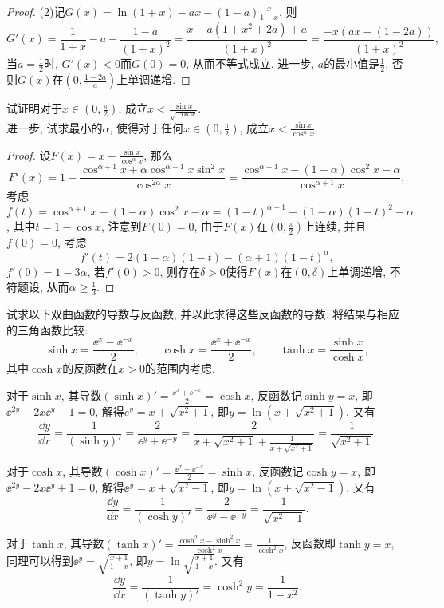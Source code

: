 \begin{quiza}
\begin{proof}
(2)记\(G(x)=\ln(1+x)-ax-(1-a)\frac{x}{1+x}\), 则\[G'(x)=\frac{1}{1+x}-a-\frac{1-a}{(1+x)^2}=\frac{x-a(1+x^2+2a)+a}{(1+x)^2}=\frac{-x(ax-(1-2a))}{(1+x)^2},\]当\(a=\frac{1}{2}\)时, \(G'(x)<0\)而\(G(0)=0\), 从而不等式成立. 进一步, \(a\)的最小值是\(\frac{1}{2}\), 否则\(G(x)\)在\(\left(0,\frac{1-2a}{a}\right)\)上单调递增.
\end{proof}
\woe 试证明对于\(x\in\left(0,\frac{\pi}{2}\right)\), 成立\(x<\frac{\sin x}{\sqrt{\cos x}}\).\\ 进一步, 试求最小的\(\alpha\), 使得对于任何\(x\in\left(0,\frac{\pi}{2}\right)\), 成立\(x<\frac{\sin x}{\cos^\alpha x}\).
\begin{proof}
设\(F(x)=x-\frac{\sin x}{\cos^{\alpha}x}\), 那么\[F'(x)=1-\frac{\cos^{\alpha+1}x+\alpha\cos^{\alpha-1}x\sin^2x}{\cos^{2\alpha}x}=\frac{\cos^{\alpha+1}x-(1-\alpha)\cos^2x-\alpha}{\cos^{\alpha+1}x},\]考虑\(f(t)=\cos^{\alpha+1}x-(1-\alpha)\cos^2x-\alpha=(1-t)^{\alpha+1}-(1-\alpha)(1-t)^2-\alpha\), 其中\(t=1-\cos x\), 注意到\(F(0)=0\), 由于\(F(x)\)在\(\left(0,\frac{\pi}{2}\right)\)上连续, 并且\(f(0)=0\), 考虑\[f'(t)=2(1-\alpha)(1-t)-(\alpha+1)(1-t)^\alpha,\]\(f'(0)=1-3\alpha\), 若\(f'(0)>0\), 则存在\(\delta>0\)使得\(F(x)\)在\((0,\delta)\)上单调递增, 不符题设, 从而\(\alpha\geqslant\frac{1}{3}\).
\end{proof}
\woe 试求以下双曲函数的导数与反函数, 并以此求得这些反函数的导数. 将结果与相应的三角函数比较:\[\sinh x=\frac{\ee^x-\ee^{-x}}{2},\qquad \cosh x=\frac{\ee^x+\ee^{-x}}{2},\qquad \tanh x=\frac{\sinh x}{\cosh x},\]其中\(\cosh x\)的反函数在\(x>0\)的范围内考虑.
\begin{solution}
对于\(\sinh x\), 其导数\(\left(\sinh x\right)'=\frac{\ee^x+\ee^{-x}}{2}=\cosh x\), 反函数记\(\sinh y=x\), 即\(\ee^{2y}-2x\ee^{y}-1=0\), 解得\(e^{y}=x+\sqrt{x^2+1}\), 即\(y=\ln(x+\sqrt{x^2+1})\). 又有\[\frac{\dd y}{\dd x}=\frac{1}{(\sinh y)'}=\frac{2}{\ee^{y}+\ee^{-y}}=\frac{2}{x+\sqrt{x^2+1}+\displaystyle\frac{1}{x+\sqrt{x^2+1}}}=\frac{1}{\sqrt{x^2+1}}.\]

对于\(\cosh x\), 其导数\((\cosh x)'=\frac{\ee^x-\ee^{-x}}{2}=\sinh x\), 反函数记\(\cosh y=x\), 即\(\ee^{2y}-2x\ee^{y}+1=0\), 解得\(\ee^y=x+\sqrt{x^2-1}\), 即\(y=\ln(x+\sqrt{x^2-1})\). 又有\[\frac{\dd y}{\dd x}=\frac{1}{(\cosh y)'}=\frac{2}{\ee^y-\ee^{-y}}=\frac{1}{\sqrt{x^2-1}}.\]

对于\(\tanh x\), 其导数\(\left(\tanh x\right)'=\frac{\cosh^2x-\sinh^2x}{\cosh^2x}=\frac{1}{\cosh^2x}\), 反函数即\(\tanh y=x\), 同理可以得到\(\ee^y=\sqrt{\frac{x+1}{1-x}}\), 即\(y=\ln\sqrt{\frac{x+1}{1-x}}\). 又有\[\frac{\dd y}{\dd x}=\frac{1}{(\tanh y)'}=\cosh^2y=\frac{1}{1-x^2}.\]


\end{solution}
\end{quiza}

